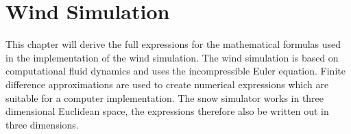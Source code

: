 \chapter{Wind Simulation}

This chapter will derive the full expressions for the mathematical formulas 
used in the implementation of the wind simulation. The wind simulation is 
based on computational fluid dynamics and uses the incompressible Euler 
equation. Finite difference approximations are used to create numerical 
expressions which are suitable for a computer implementation. The snow simulator 
works in three dimensional Euclidean space, the expressions therefore also be 
written out in three dimensions. 

